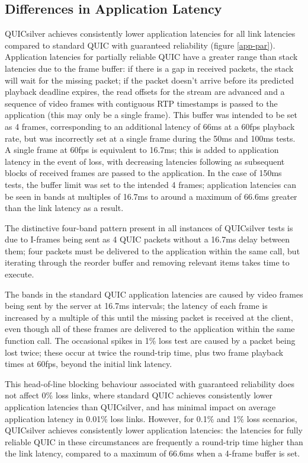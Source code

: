 \documentclass{mpaper}
\begin{document}
\subsection{Differences in Application Latency}

QUICsilver achieves consistently lower application latencies for all link latencies compared to standard QUIC with guaranteed reliability (figure \ref{app-par}). Application latencies for partially reliable QUIC have a greater range than stack latencies due to the frame buffer: if there is a gap in received packets, the stack will wait for the missing packet; if the packet doesn't arrive before its predicted playback deadline expires, the read offsets for the stream are advanced and a sequence of video frames with contiguous RTP timestamps is passed to the application (this may only be a single frame). This buffer was intended to be set as 4 frames, corresponding to an additional latency of 66ms at a 60fps playback rate, but was incorrectly set at a single frame during the 50ms and 100ms tests. A single frame at 60fps is equivalent to 16.7ms; this is added to application latency in the event of loss, with decreasing latencies following as subsequent blocks of received frames are passed to the application. In the case of 150ms tests, the buffer limit was set to the intended 4 frames; application latencies can be seen in bands at multiples of 16.7ms to around a maximum of 66.6ms greater than the link latency as a result.


The distinctive four-band pattern present in all instances of QUICsilver tests is due to I-frames being sent as 4 QUIC packets without a 16.7ms delay between them; four packets must be delivered to the application within the same call, but iterating through the reorder buffer and removing relevant items takes time to execute.


The bands in the standard QUIC application latencies are caused by video frames being sent by the server at 16.7ms intervals; the latency of each frame is increased by a multiple of this until the missing packet is received at the client, even though all of these frames are delivered to the application within the same function call. The occasional spikes in 1\% loss test are caused by a packet being lost twice; these occur at twice the round-trip time, plus two frame playback times at 60fps, beyond the initial link latency.


This head-of-line blocking behaviour associated with guaranteed reliability does not affect 0\% loss links, where standard QUIC achieves consistently lower application latencies than QUICsilver, and has minimal impact on average application latency in 0.01\% loss links. However, for 0.1\% and 1\% loss scenarios, QUICsilver achieves consistently lower application latencies: the latencies for fully reliable QUIC in these circumstances are frequently a round-trip time higher than the link latency, compared to a maximum of 66.6ms when a 4-frame buffer is set.
\end{document}
